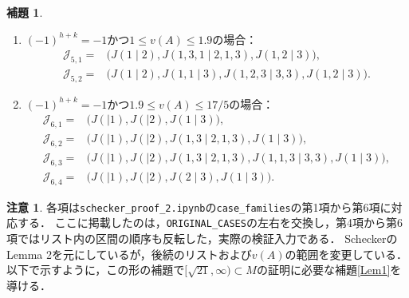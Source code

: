 \documentclass[10pt,a4paper]{ujarticle}
\theoremstyle{definition}
\newtheorem{lemma}{補題}
\newtheorem{remark}{注意}
\begin{document}
\begin{lemma}
\begin{enumerate}
\[\begin{aligned}
        \mathcal{J}_{4,3}={}&\bigl(J(\mid 1), J(3\mid 3), J(1\mid 2)\bigr),\\
        \mathcal{J}_{4,4}={}&\bigl(J(\mid 1), J(2\mid 2), J(1\mid 2)\bigr).
      \end{aligned}
    \]
    \item \label{Lem2:family5} $(-1)^{h+k}=-1$かつ$1\le v(A)\le1.9$の場合：
    \[
      \begin{aligned}
        \mathcal{J}_{5,1}={}&\bigl(J(1\mid 2), J(1,3,1\mid 2,1,3), J(1,2\mid 3)\bigr),\\
        \mathcal{J}_{5,2}={}&\bigl(J(1\mid 2), J(1,1\mid 3), J(1,2,3\mid 3,3), J(1,2\mid 3)\bigr).
      \end{aligned}
    \]
    \item \label{Lem2:family6} $(-1)^{h+k}=-1$かつ$1.9\le v(A)\le17/5$の場合：
    \[
      \begin{aligned}
        \mathcal{J}_{6,1}={}&\bigl(J(\mid 1), J(\mid 2), J(1\mid 3)\bigr),\\
        \mathcal{J}_{6,2}={}&\bigl(J(\mid 1), J(\mid 2), J(1,3\mid 2,1,3), J(1\mid 3)\bigr),\\
        \mathcal{J}_{6,3}={}&\bigl(J(\mid 1), J(\mid 2), J(1,3\mid 2,1,3), J(1,1,3\mid 3,3), J(1\mid 3)\bigr),\\
        \mathcal{J}_{6,4}={}&\bigl(J(\mid 1), J(\mid 2), J(2\mid 3), J(1\mid 3)\bigr).
      \end{aligned}
    \]
  \end{enumerate}
\end{lemma}
\begin{remark}
  各項は\verb|schecker_proof_2.ipynb|の\verb|case_families|の第1項から第6項に対応する．
  ここに掲載したのは，\verb|ORIGINAL_CASES|の左右を交換し，第4項から第6項ではリスト内の区間の順序も反転した，実際の検証入力である．
  ScheckerのLemma 2を元にしているが，後続のリストおよび$v(A)$の範囲を変更している．
  以下で示すように，この形の補題で$[\sqrt{21},\infty)\subset M$の証明に必要な補題\ref{Lem1}を導ける．
\end{remark}
\end{document}
